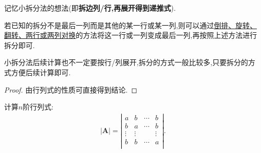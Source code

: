 \documentclass[../../main.tex]{subfiles}%
\begin{document}
\begin{note}
记忆小拆分法的想法(即\textbf{拆边列/行,再展开得到递推式}).
\end{note}
\begin{remark}
若已知的拆分不是最后一列而是其他的某一行或某一列,则可以通过\hyperref[pro:行列式计算常识]{倒排、旋转、翻转、两行或两列对换}的方法将这一行或一列变成最后一列,再按照上述方法进行拆分即可.

小拆分法后续计算也不一定要按行/列展开,拆分的方式一般比较多,只要拆分的方式方便后续计算即可. 
\end{remark}
\begin{proof}

由行列式的性质可直接得到结论.

\end{proof}

\begin{proposition}\label{大/小拆分法例题1}
计算$n$阶行列式:
\begin{align*}
|\boldsymbol{A}|=\left| \begin{matrix}
a&		b&		\cdots&		b\\
b&		a&		\cdots&		b\\
\vdots&		\vdots&		&		\vdots\\
b&		b&		\cdots&		a\\
\end{matrix} \right|.
\end{align*}
\end{proposition}
\end{document}
